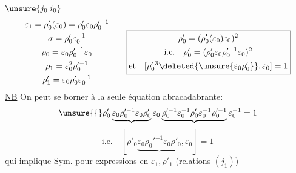 \textcircled{$\unsure{j_0|i_0}$}
\[
\begin{gathered}
\varepsilon_1=\rho'_0(\varepsilon_0)=\rho'_0\varepsilon_0\rho_0'^{-1}\\
\sigma=\rho'_0\varepsilon_0^{-1}\\
\rho_0=\varepsilon_0\rho_0'^{-1}\varepsilon_0\\
\rho_1=\varepsilon_0^2\rho_0'^{-1}\\
\rho'_1=\varepsilon_0\rho'_0\varepsilon_0^{-1}
\end{gathered}
\qquad
\boxed{\begin{gathered}
\rho'_0=(\rho'_0(\varepsilon_0)\varepsilon_0)^2\\
\text{i.e.}\quad\rho'_0=(\rho'_0\varepsilon_0\rho_0'^{-1}\varepsilon_0)^2\\
\text{et}\quad[\rho_0'{}^3\deleted{\unsure{\varepsilon_0\rho'_0}},\varepsilon_0]=1
\end{gathered}}
\]
\uline{NB} On peut se borner à la seule équation abracadabrante:
\[
\unsure{\{}\rho'_0\underbrace{\varepsilon_0\rho_0'^{-1}\varepsilon_0\rho'_0}\varepsilon_0
\underbrace{\rho_0'^{-1}\varepsilon_0^{-1}\rho'_0\varepsilon_0^{-1}\rho_0'^{-1}}\varepsilon_0^{-1}=1
\]
\[
\text{i.e.}\quad[\rho'_0\underbrace{\varepsilon_0\rho_0'^{-1}\varepsilon_0\rho'_0},\varepsilon_0]=1
\]
qui implique
Sym. pour expressions en $\varepsilon_1,\rho'_1$ (relations $(j_1)$)

